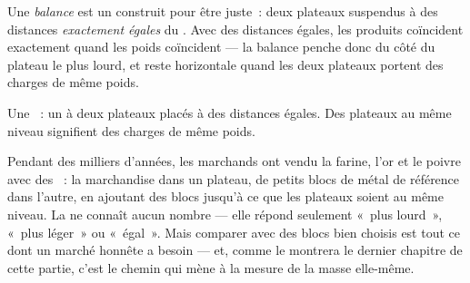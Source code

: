 \begin{definition}[Balance]\label{def:g3:levers-and-scales:scale}
Une \emph{balance} est un  construit pour être
juste~: deux plateaux suspendus à des distances \emph{exactement
égales} du . Avec des distances égales, les produits coïncident
exactement quand les poids coïncident --- la balance penche donc du
côté du plateau le plus lourd, et reste horizontale quand les deux
plateaux portent des charges de même poids.
\end{definition}

\begin{omfigure}

{\small Une ~: un  à deux plateaux placés à des
distances égales. Des plateaux au même niveau signifient des charges
de même poids.}
\end{omfigure}

\begin{example}\label{ex:g3:levers-and-scales:weighing}
Pendant des milliers d'années, les marchands ont vendu la farine,
l'or et le poivre avec des ~: la marchandise dans un plateau,
de petits blocs de métal de référence dans l'autre, en ajoutant des
blocs jusqu'à ce que les plateaux soient au même niveau. La 
ne connaît aucun nombre --- elle répond seulement «~plus lourd~»,
«~plus léger~» ou «~égal~». Mais comparer avec des blocs bien choisis
est tout ce dont un marché honnête a besoin --- et, comme le montrera
le dernier chapitre de cette partie, c'est le chemin qui mène à la
mesure de la masse elle-même.
\end{example}

